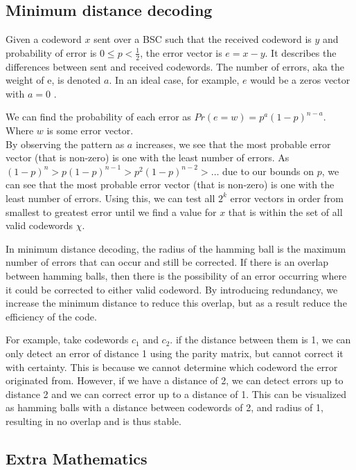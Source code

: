 \subsection{Minimum distance decoding}

Given a codeword $x$ sent over a BSC such that the received codeword is $y$ and probability of error is $0 \le p < \frac{1}{2}$, the error vector is $e = x-y$. It describes the differences between sent and received codewords. The number of errors, aka the weight of e, is denoted $a$. In an ideal case, for example, $e$ would be a zeros vector with $a = 0$ . 

We can find the probability of each error as $Pr(e = w) = p^a(1-p)^{n-a}$. Where $w$ is some error vector.\\

By observing the pattern as $a$ increases, we see that the most probable error vector (that is non-zero) is one with the least number of errors.
As $(1-p)^n > p(1-p)^{n-1} > p^2(1-p)^{n-2} > \dots$ due to our bounds on $p$, we can see that the most probable error vector (that is non-zero) is one with the least number of errors. Using this, we can test all $2^k$ error vectors in order from smallest to greatest error until we find a value for $x$ that is within the set of all valid codewords $\chi$.

In minimum distance decoding, the radius of the hamming ball is the maximum number of errors that can occur and still be corrected. If there is an overlap between hamming balls, then there is the possibility of an error occurring where it could be corrected to either valid codeword. By introducing redundancy, we increase the minimum distance to reduce this overlap, but as a result reduce the efficiency of the code.


For example, take codewords $c_1$ and $c_2$. if the distance between them is 1, we can only detect an error of distance 1 using the parity matrix, but cannot correct it with certainty. This is because we cannot determine which codeword the error originated from. However, if we have a distance of 2, we can detect errors up to distance 2 and we can correct error up to a distance of 1. This can be visualized as hamming balls with a distance between codewords of 2, and radius of 1, resulting in no overlap and is thus stable.

\subsection{Extra Mathematics}

